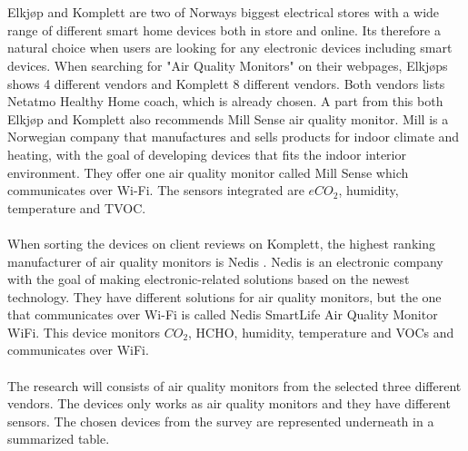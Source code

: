 \\\\
Elkjøp \cite{Elkjøp} and Komplett \cite{Komplett} are two of Norways biggest electrical stores with a wide range of different smart home devices both in store and online. Its therefore a natural choice when users are looking for any electronic devices including smart devices. When searching for "Air Quality Monitors" on their webpages, Elkjøps shows 4 different vendors and Komplett 8 different vendors. Both vendors lists Netatmo Healthy Home coach, which is already chosen. A part from this both Elkjøp and Komplett also recommends Mill Sense air quality monitor. Mill \cite{Mill} is a Norwegian company that manufactures and sells products for indoor climate and heating, with the goal of developing devices that fits the indoor interior environment. They offer one air quality monitor called Mill Sense which communicates over Wi-Fi. The sensors integrated are \(eCO_2\), humidity, temperature and TVOC.
\\\\
When sorting the devices on client reviews on Komplett, the highest ranking manufacturer of air quality monitors is Nedis \cite{Komplett}. Nedis \cite{Nedis} is an electronic company with the goal of making electronic-related solutions based on the newest technology. They have different solutions for air quality monitors, but the one that communicates over Wi-Fi is called Nedis SmartLife Air Quality Monitor WiFi. This device monitors \(CO_2\), HCHO, humidity, temperature and VOCs and communicates over WiFi. 
\\\\
The research will consists of air quality monitors from the selected three different vendors. The devices only works as air quality monitors and they have different sensors. The chosen devices from the survey are represented underneath in a summarized table. 
